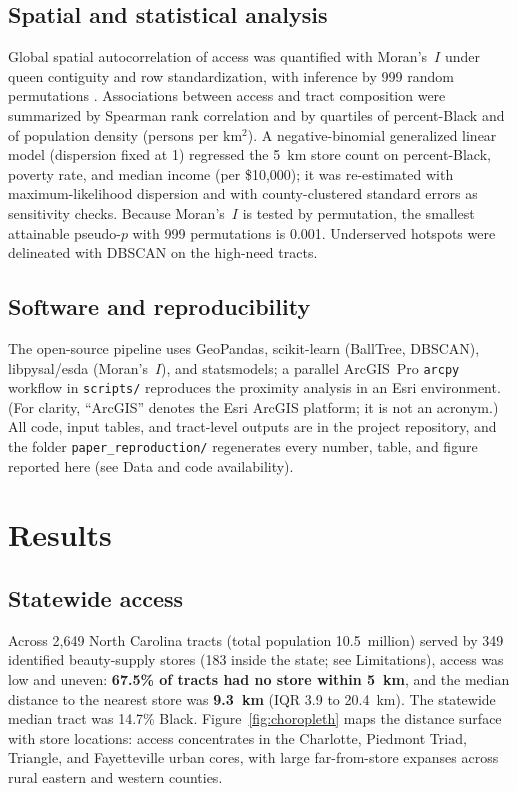 \documentclass[12pt,letterpaper]{article}
\begin{document}
\subsection{Spatial and statistical analysis}

Global spatial autocorrelation of access was quantified with Moran's~$I$ under
queen contiguity and row standardization, with inference by 999 random
permutations \citep{moran1950,anselin1995}. Associations between access and
tract composition were summarized by Spearman rank correlation and by
quartiles of percent-Black and of population density (persons per km$^2$). A
negative-binomial generalized linear model (dispersion fixed at 1) regressed the
5~km store count on percent-Black, poverty rate, and median income (per
\$10{,}000); it was re-estimated with maximum-likelihood dispersion and with
county-clustered standard errors as sensitivity checks. Because Moran's~$I$ is
tested by permutation, the smallest attainable pseudo-$p$ with 999 permutations
is 0.001. Underserved hotspots were delineated with DBSCAN on the high-need
tracts.

\subsection{Software and reproducibility}

The open-source pipeline uses GeoPandas, scikit-learn (BallTree, DBSCAN),
libpysal/esda (Moran's~$I$), and statsmodels; a parallel ArcGIS~Pro
\texttt{arcpy} workflow in \texttt{scripts/} reproduces the proximity analysis in
an Esri environment. (For clarity, ``ArcGIS'' denotes the Esri ArcGIS platform; it
is not an acronym.) All code, input tables, and tract-level outputs are in the
project repository, and the folder \texttt{paper\_reproduction/} regenerates every
number, table, and figure reported here (see Data and code availability).

\section{Results}
\label{sec:results}

\subsection{Statewide access}

Across 2{,}649 North Carolina tracts (total population 10.5~million) served by
349 identified beauty-supply stores (183 inside the state; see Limitations), access was low and uneven: \textbf{67.5\%
of tracts had no store within 5~km}, and the median distance to the nearest
store was \textbf{9.3~km} (IQR 3.9 to 20.4~km). The statewide median tract was
14.7\% Black. Figure~\ref{fig:choropleth} maps the distance surface with store
locations: access concentrates in the Charlotte, Piedmont Triad, Triangle, and
Fayetteville urban cores, with large far-from-store expanses across rural
eastern and western counties.
\end{document}
